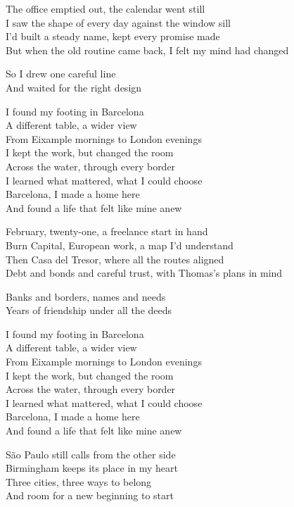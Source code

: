 \begin{lyrics}
The office emptied out, the calendar went still\\
I saw the shape of every day against the window sill\\
I’d built a steady name, kept every promise made\\
But when the old routine came back, I felt my mind had changed

So I drew one careful line\\
And waited for the right design

I found my footing in Barcelona\\
A different table, a wider view\\
From Eixample mornings to London evenings\\
I kept the work, but changed the room\\
Across the water, through every border\\
I learned what mattered, what I could choose\\
Barcelona, I made a home here\\
And found a life that felt like mine anew

February, twenty-one, a freelance start in hand\\
Burn Capital, European work, a map I’d understand\\
Then Casa del Tresor, where all the routes aligned\\
Debt and bonds and careful trust, with Thomas’s plans in mind

Banks and borders, names and needs\\
Years of friendship under all the deeds

I found my footing in Barcelona\\
A different table, a wider view\\
From Eixample mornings to London evenings\\
I kept the work, but changed the room\\
Across the water, through every border\\
I learned what mattered, what I could choose\\
Barcelona, I made a home here\\
And found a life that felt like mine anew

São Paulo still calls from the other side\\
Birmingham keeps its place in my heart\\
Three cities, three ways to belong\\
And room for a new beginning to start


\end{lyrics}

